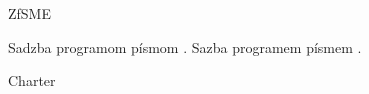 




\ifx\ToWp\undefined \def\ToWp{} \fi

\ifx\elq\undefined \chardef {} \fi

\ifx\ZFroot\undefined \def\ZFroot{} \fi %
\ifx\Vers\undefined  \ZFroot ZfSME \fi %

%
{Sadzba programom  písmom \FontType.}
%
{Sazba programem  písmem \FontType.}
\def\TypoInfo{%
\ifdim\vsize > 110mm \vskip 48pt\noindent \else \medskip\noindent \fi
\mtext{typoinfo}}


\def\CR{\caps\rm}
\def\CB{\caps\bf}
\ifx\FontType\CMCS 
\let\CR=\empty 
\let\CB=\bf 
\def\clq{,}
\def\crq{`}
\fi
\def\tmp{Charter}
\ifx\FontType\tmp
\let\CR=\empty 
\let\CB=\bf 
\fi

\def\ScenaPopis#1\par{%
\noindent{\it #1\par}\medskip\noindent}

\def\SP#1){%
{\it #1)\/}}

\def\SPP#1){\noindent %
{\it #1)\/}\smallskip}



